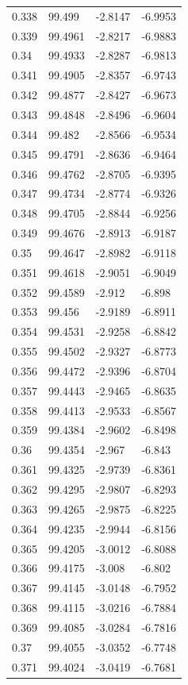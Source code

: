 \begin{tabular}{llll}
0.338 & 99.499 & -2.8147 & -6.9953 \\
0.339 & 99.4961 & -2.8217 & -6.9883 \\
0.34 & 99.4933 & -2.8287 & -6.9813 \\
0.341 & 99.4905 & -2.8357 & -6.9743 \\
0.342 & 99.4877 & -2.8427 & -6.9673 \\
0.343 & 99.4848 & -2.8496 & -6.9604 \\
0.344 & 99.482 & -2.8566 & -6.9534 \\
0.345 & 99.4791 & -2.8636 & -6.9464 \\
0.346 & 99.4762 & -2.8705 & -6.9395 \\
0.347 & 99.4734 & -2.8774 & -6.9326 \\
0.348 & 99.4705 & -2.8844 & -6.9256 \\
0.349 & 99.4676 & -2.8913 & -6.9187 \\
0.35 & 99.4647 & -2.8982 & -6.9118 \\
0.351 & 99.4618 & -2.9051 & -6.9049 \\
0.352 & 99.4589 & -2.912 & -6.898 \\
0.353 & 99.456 & -2.9189 & -6.8911 \\
0.354 & 99.4531 & -2.9258 & -6.8842 \\
0.355 & 99.4502 & -2.9327 & -6.8773 \\
0.356 & 99.4472 & -2.9396 & -6.8704 \\
0.357 & 99.4443 & -2.9465 & -6.8635 \\
0.358 & 99.4413 & -2.9533 & -6.8567 \\
0.359 & 99.4384 & -2.9602 & -6.8498 \\
0.36 & 99.4354 & -2.967 & -6.843 \\
0.361 & 99.4325 & -2.9739 & -6.8361 \\
0.362 & 99.4295 & -2.9807 & -6.8293 \\
0.363 & 99.4265 & -2.9875 & -6.8225 \\
0.364 & 99.4235 & -2.9944 & -6.8156 \\
0.365 & 99.4205 & -3.0012 & -6.8088 \\
0.366 & 99.4175 & -3.008 & -6.802 \\
0.367 & 99.4145 & -3.0148 & -6.7952 \\
0.368 & 99.4115 & -3.0216 & -6.7884 \\
0.369 & 99.4085 & -3.0284 & -6.7816 \\
0.37 & 99.4055 & -3.0352 & -6.7748 \\
0.371 & 99.4024 & -3.0419 & -6.7681 \\

\end{tabular}
